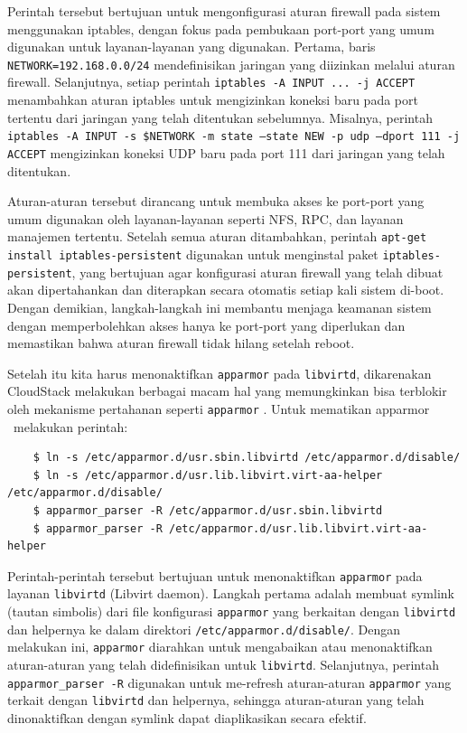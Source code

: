 Perintah tersebut bertujuan untuk mengonfigurasi aturan firewall pada sistem menggunakan iptables, dengan fokus pada pembukaan port-port yang umum digunakan untuk layanan-layanan yang digunakan. Pertama, baris \texttt{NETWORK=192.168.0.0/24} mendefinisikan jaringan yang diizinkan melalui aturan firewall. Selanjutnya, setiap perintah \texttt{iptables -A INPUT ... -j ACCEPT} menambahkan aturan iptables untuk mengizinkan koneksi baru pada port tertentu dari jaringan yang telah ditentukan sebelumnya. Misalnya, perintah \texttt{iptables -A INPUT -s \$NETWORK -m state --state NEW -p udp --dport 111 -j ACCEPT} mengizinkan koneksi UDP baru pada port 111 dari jaringan yang telah ditentukan.

Aturan-aturan tersebut dirancang untuk membuka akses ke port-port yang umum digunakan oleh layanan-layanan seperti NFS, RPC, dan layanan manajemen tertentu. Setelah semua aturan ditambahkan, perintah \texttt{apt-get install iptables-persistent} digunakan untuk menginstal paket \texttt{iptables-persistent}, yang bertujuan agar konfigurasi aturan firewall yang telah dibuat akan dipertahankan dan diterapkan secara otomatis setiap kali sistem di-boot. Dengan demikian, langkah-langkah ini membantu menjaga keamanan sistem dengan memperbolehkan akses hanya ke port-port yang diperlukan dan memastikan bahwa aturan firewall tidak hilang setelah reboot.

Setelah itu kita harus menonaktifkan \texttt{apparmor} pada \texttt{libvirtd}, dikarenakan CloudStack melakukan berbagai macam hal yang memungkinkan bisa terblokir oleh mekanisme pertahanan seperti \texttt{apparmor} \cite{apacheHostInstallation}. Untuk mematikan apparmor \saya\ melakukan perintah:

\begin{listing}[H]
    \begin{verbatim}   
    $ ln -s /etc/apparmor.d/usr.sbin.libvirtd /etc/apparmor.d/disable/
    $ ln -s /etc/apparmor.d/usr.lib.libvirt.virt-aa-helper /etc/apparmor.d/disable/
    $ apparmor_parser -R /etc/apparmor.d/usr.sbin.libvirtd
    $ apparmor_parser -R /etc/apparmor.d/usr.lib.libvirt.virt-aa-helper
    \end{verbatim}
\end{listing}

Perintah-perintah tersebut bertujuan untuk menonaktifkan \texttt{apparmor} pada layanan \texttt{libvirtd} (Libvirt daemon). Langkah pertama adalah membuat symlink (tautan simbolis) dari file konfigurasi \texttt{apparmor} yang berkaitan dengan \texttt{libvirtd} dan helpernya ke dalam direktori \texttt{/etc/apparmor.d/disable/}. Dengan melakukan ini, \texttt{apparmor} diarahkan untuk mengabaikan atau menonaktifkan aturan-aturan yang telah didefinisikan untuk \texttt{libvirtd}. Selanjutnya, perintah \texttt{apparmor\_parser -R} digunakan untuk me-refresh aturan-aturan \texttt{apparmor} yang terkait dengan \texttt{libvirtd} dan helpernya, sehingga aturan-aturan yang telah dinonaktifkan dengan symlink dapat diaplikasikan secara efektif.

